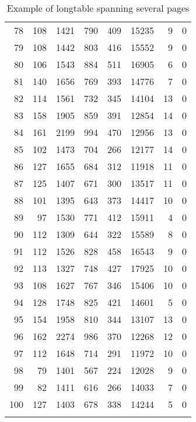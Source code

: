 \documentclass[letterpaper]{article}
\begin{document}
\begin{Schunk}
\begin{longtable}{rrrrrrrr}
  78 & 108 & 1421 & 790 & 409 & 15235 & 9 & 0 \\ 
  79 & 108 & 1442 & 803 & 416 & 15552 & 9 & 0 \\ 
  80 & 106 & 1543 & 884 & 511 & 16905 & 6 & 0 \\ 
  81 & 140 & 1656 & 769 & 393 & 14776 & 7 & 0 \\ 
  82 & 114 & 1561 & 732 & 345 & 14104 & 13 & 0 \\ 
  83 & 158 & 1905 & 859 & 391 & 12854 & 14 & 0 \\ 
  84 & 161 & 2199 & 994 & 470 & 12956 & 13 & 0 \\ 
  85 & 102 & 1473 & 704 & 266 & 12177 & 14 & 0 \\ 
  86 & 127 & 1655 & 684 & 312 & 11918 & 11 & 0 \\ 
  87 & 125 & 1407 & 671 & 300 & 13517 & 11 & 0 \\ 
  88 & 101 & 1395 & 643 & 373 & 14417 & 10 & 0 \\ 
  89 & 97 & 1530 & 771 & 412 & 15911 & 4 & 0 \\ 
  90 & 112 & 1309 & 644 & 322 & 15589 & 8 & 0 \\ 
  91 & 112 & 1526 & 828 & 458 & 16543 & 9 & 0 \\ 
  92 & 113 & 1327 & 748 & 427 & 17925 & 10 & 0 \\ 
  93 & 108 & 1627 & 767 & 346 & 15406 & 10 & 0 \\ 
  94 & 128 & 1748 & 825 & 421 & 14601 & 5 & 0 \\ 
  95 & 154 & 1958 & 810 & 344 & 13107 & 13 & 0 \\ 
  96 & 162 & 2274 & 986 & 370 & 12268 & 12 & 0 \\ 
  97 & 112 & 1648 & 714 & 291 & 11972 & 10 & 0 \\ 
  98 & 79 & 1401 & 567 & 224 & 12028 & 9 & 0 \\ 
  99 & 82 & 1411 & 616 & 266 & 14033 & 7 & 0 \\ 
  100 & 127 & 1403 & 678 & 338 & 14244 & 5 & 0 \\ 
   \hline
\hline
\caption{Example of longtable spanning several pages} 
\label{tabbig}
\end{longtable}\end{Schunk}
\end{document}
